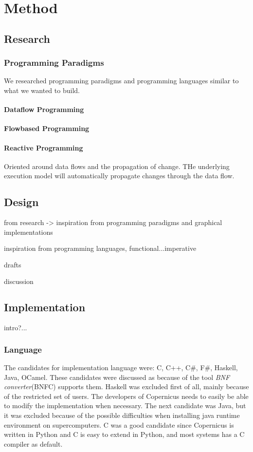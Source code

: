 \chapter{Method}

\section{Research}

\subsection{Programming Paradigms}
We researched programming paradigms and programming languages similar
to what we wanted to build.

\subsubsection{Dataflow Programming}

\subsubsection{Flowbased Programming}

\subsubsection{Reactive Programming}
Oriented around data flows and the propagation of change. THe
underlying execution model will automatically propagate changes
through the data flow.


\section{Design}
from research -> inspiration from programming paradigms and graphical implementations

inspiration from programming languages, functional...imperative

drafts

discussion


\section{Implementation}
intro?...

\subsection{Language}
The candidates for implementation language were: C, C++, C\#, F\#,
Haskell, Java, OCamel. These candidates were discussed as because of
the tool \emph{BNF converter}(BNFC) supports them. Haskell was
excluded first of all, mainly because of the restricted set of
users. The developers of Copernicus needs to easily be able to modify
the implementation when necessary. The next candidate was Java, but it
was excluded because of the possible difficulties when installing java
runtime environment on supercomputers. C was a good candidate since
Copernicus is written in Python and C is easy to extend in Python, and
most systems has a C compiler as default.


